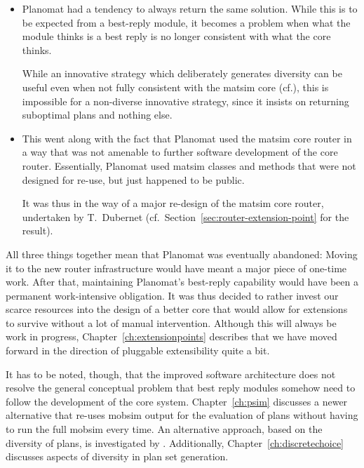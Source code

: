 \begin{itemize}
\item Planomat had a tendency to always return the same solution. While this is to be expected from a best-reply module, it becomes a problem when what the module thinks is a best reply is no longer consistent with what the core thinks.  

While an innovative strategy which deliberately generates  diversity can be useful even when not fully consistent with the \gls{matsim} core (cf.\cite{NagelKickhoeferJoubertHeterogeneousVoTs}), this is impossible for a non-diverse innovative strategy, since it insists on returning suboptimal plans and nothing else.

\item This went along with the fact that Planomat used the \gls{matsim} core router in a way that was not amenable to further software development of the core router.  Essentially, Planomat used \gls{matsim} classes and methods that were not designed for re-use, but just happened to be public.

It was thus in the way of a major re-design of the \gls{matsim} core router, undertaken by T.~Dubernet (cf.~Section~\ref{sec:router-extension-point} for the result).

\end{itemize}

All three things together mean that Planomat was eventually abandoned: Moving it to the new router infrastructure would have meant a major piece of one-time work. After that, maintaining Planomat's best-reply capability would have been a permanent work-intensive obligation. It was thus decided to rather invest our scarce resources into the design of a better core that would allow for extensions to survive without a lot of manual intervention. Although this will always be work in progress, Chapter~\ref{ch:extensionpoints} describes that we have moved forward in the direction of pluggable extensibility quite a bit.

 It has to be noted, though, that the improved software architecture does not resolve the general conceptual problem that best reply modules somehow need to follow the development of the core system. Chapter~\ref{ch:psim} discusses a newer alternative that re-uses \gls{mobsim} output for the evaluation of plans without having to run the full \gls{mobsim} every time. An alternative approach, based on the diversity of plans, is investigated by \cite{NagelKickhoeferJoubertHeterogeneousVoTs}. Additionally, Chapter~\ref{ch:discretechoice} discusses aspects of diversity in plan set generation.

